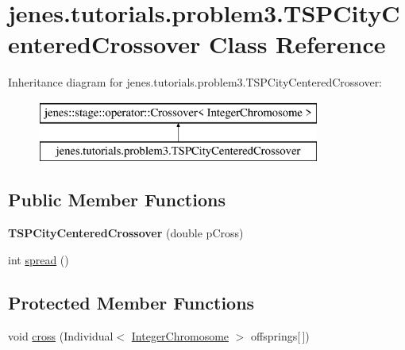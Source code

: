 \hypertarget{classjenes_1_1tutorials_1_1problem3_1_1_t_s_p_city_centered_crossover}{\section{jenes.\-tutorials.\-problem3.\-T\-S\-P\-City\-Centered\-Crossover Class Reference}
\label{classjenes_1_1tutorials_1_1problem3_1_1_t_s_p_city_centered_crossover}
}
Inheritance diagram for jenes.\-tutorials.\-problem3.\-T\-S\-P\-City\-Centered\-Crossover\-:\begin{figure}[H]
\begin{center}
\leavevmode
\includegraphics[height=2.000000cm]{classjenes_1_1tutorials_1_1problem3_1_1_t_s_p_city_centered_crossover}
\end{center}
\end{figure}
\subsection*{Public Member Functions}
\begin{DoxyCompactItemize}
\item 
\hypertarget{classjenes_1_1tutorials_1_1problem3_1_1_t_s_p_city_centered_crossover_a1609c37822bff6e6af8cb82082d8cd9d}{{\bfseries T\-S\-P\-City\-Centered\-Crossover} (double p\-Cross)}\label{classjenes_1_1tutorials_1_1problem3_1_1_t_s_p_city_centered_crossover_a1609c37822bff6e6af8cb82082d8cd9d}

\item 
int \hyperlink{classjenes_1_1tutorials_1_1problem3_1_1_t_s_p_city_centered_crossover_a3a5e0f99396f1fb6dc89981969d58c13}{spread} ()
\end{DoxyCompactItemize}
\subsection*{Protected Member Functions}
\begin{DoxyCompactItemize}
\item 
void \hyperlink{classjenes_1_1tutorials_1_1problem3_1_1_t_s_p_city_centered_crossover_aeb7cb2d42aeeea2cb008f98d63b64805}{cross} (Individual$<$ \hyperlink{classjenes_1_1chromosome_1_1_integer_chromosome}{Integer\-Chromosome} $>$ offsprings\mbox{[}$\,$\mbox{]})
\end{DoxyCompactItemize}


